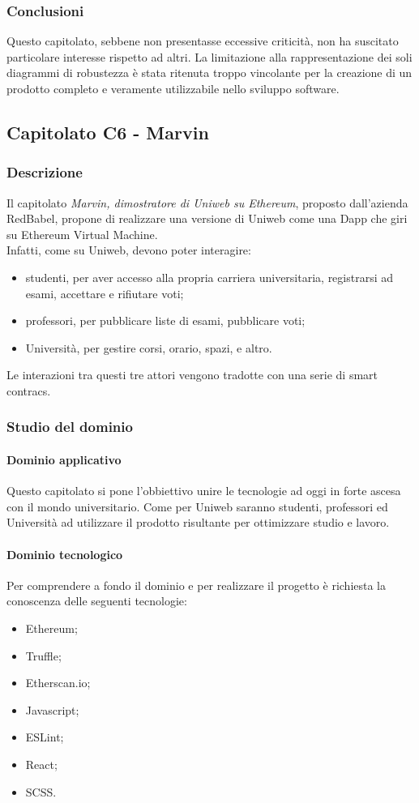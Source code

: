 		\subsubsection{Conclusioni}
		Questo capitolato, sebbene non presentasse eccessive criticità, non ha suscitato particolare interesse rispetto ad altri. La limitazione alla rappresentazione dei soli diagrammi di robustezza è stata ritenuta troppo vincolante per la creazione di un prodotto completo e veramente utilizzabile nello sviluppo software.
		
		
	\subsection{Capitolato C6 - Marvin}
		\subsubsection{Descrizione}
		Il capitolato \emph{Marvin, dimostratore di Uniweb su Ethereum}, proposto dall'azienda RedBabel, propone di realizzare una versione di Uniweb come una Dapp che giri su Ethereum Virtual Machine. \\  Infatti, come su Uniweb, devono poter interagire:
		\begin{itemize} 
			\item studenti, per aver accesso alla propria carriera universitaria, registrarsi ad esami, accettare e rifiutare voti; 
			\item professori, per pubblicare liste di esami, pubblicare voti;
			\item Università, per gestire corsi, orario, spazi, e altro.
		\end{itemize}
	 	Le interazioni tra questi tre attori vengono tradotte con una serie di smart contracs.
		\subsubsection{Studio del dominio}
			\paragraph{Dominio applicativo} \Spazio
			Questo capitolato si pone l'obbiettivo unire le tecnologie ad oggi in forte ascesa con il mondo universitario. Come per Uniweb saranno studenti, professori ed Università ad utilizzare il prodotto risultante per ottimizzare studio e lavoro.
			\paragraph{Dominio tecnologico} \Spazio
			Per comprendere a fondo il dominio e per realizzare il progetto è richiesta la conoscenza delle seguenti tecnologie:
			\begin{itemize}
				\item Ethereum;
				\item Truffle;
				\item Etherscan.io;
				\item Javascript;
				\item ESLint;
				\item React;
				\item SCSS.
			\end{itemize}

